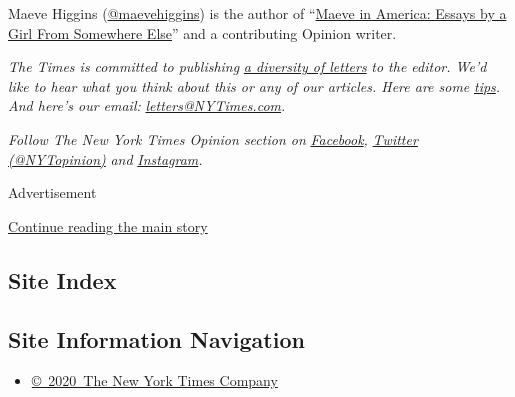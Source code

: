 Maeve Higgins (\href{https://twitter.com/maevehiggins}{@maevehiggins})
is the author of
``\href{https://www.penguinrandomhouse.com/books/546681/maeve-in-america-by-maeve-higgins/}{Maeve
in America: Essays by a Girl From Somewhere Else}'' and a contributing
Opinion writer.

\emph{The Times is committed to publishing}
\href{https://www.nytimes3xbfgragh.onion/2019/01/31/opinion/letters/letters-to-editor-new-york-times-women.html}{\emph{a
diversity of letters}} \emph{to the editor. We'd like to hear what you
think about this or any of our articles. Here are some}
\href{https://help.nytimes3xbfgragh.onion/hc/en-us/articles/115014925288-How-to-submit-a-letter-to-the-editor}{\emph{tips}}\emph{.
And here's our email:}
\href{mailto:letters@NYTimes.com}{\emph{letters@NYTimes.com}}\emph{.}

\emph{Follow The New York Times Opinion section on}
\href{https://www.facebookcorewwwi.onion/nytopinion}{\emph{Facebook}}\emph{,}
\href{http://twitter.com/NYTOpinion}{\emph{Twitter (@NYTopinion)}}
\emph{and}
\href{https://www.instagram.com/nytopinion/}{\emph{Instagram}}\emph{.}

Advertisement

\protect\hyperlink{after-bottom}{Continue reading the main story}

\hypertarget{site-index}{%
\subsection{Site Index}\label{site-index}}

\hypertarget{site-information-navigation}{%
\subsection{Site Information
Navigation}\label{site-information-navigation}}

\begin{itemize}
\tightlist
\item
  \href{https://help.nytimes3xbfgragh.onion/hc/en-us/articles/115014792127-Copyright-notice}{©~2020~The
  New York Times Company}
\end{itemize}

